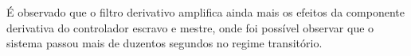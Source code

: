 É observado que o filtro derivativo amplifica ainda mais os efeitos da componente derivativa do controlador
escravo e mestre, onde foi possível observar que o sistema passou mais de
duzentos segundos no regime transitório.